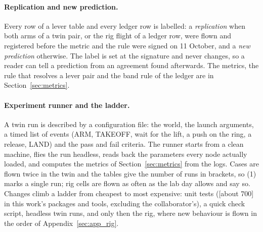 \paragraph{Replication and new prediction.} Every row of a lever table and every ledger row is labelled: a
\emph{replication} when both arms of a twin pair, or the rig flight of a ledger row, were flown and registered
before the metric and the rule were signed on 11 October, and a \emph{new prediction} otherwise. The label is set
at the signature and never changes, so a reader can tell a prediction from an agreement found afterwards. The
metrics, the rule that resolves a lever pair and the band rule of the ledger are in Section~\ref{sec:metrics}.

\paragraph{Experiment runner and the ladder.} A twin run is described by a configuration file: the world, the
launch arguments, a timed list of events (ARM, TAKEOFF, wait for the lift, a push on the ring, a release, LAND)
and the pass and fail criteria. The runner starts from a clean machine, flies the run headless, reads back the
parameters every node actually loaded, and computes the metrics of Section~\ref{sec:metrics} from the logs. Cases
are flown twice in the twin and the tables give the number of runs in brackets, so (1) marks a single run; rig
cells are flown as often as the lab day allows and say so. Changes climb a ladder from cheapest to most expensive:
unit tests ([about 700] in this work's packages and tools, excluding the collaborator's), a quick check script,
headless twin runs, and only then the rig, where new behaviour is flown in the order of
Appendix~\ref{sec:app_rig}.
